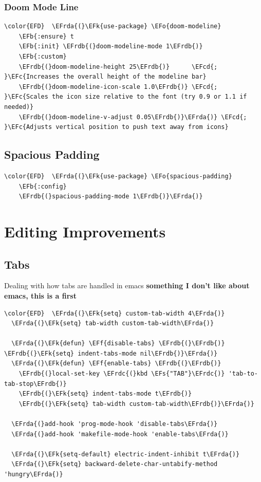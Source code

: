 \documentclass[11pt]{article}
\newcommand{\EFc}[1]{\textcolor{EFc}{#1}} %
\newcommand{\EFcd}[1]{\textcolor{EFcd}{#1}} %
\newcommand{\EFs}[1]{\textcolor{EFs}{#1}} %
\newcommand{\EFk}[1]{\textcolor{EFk}{#1}} %
\newcommand{\EFb}[1]{\textcolor{EFb}{#1}} %
\newcommand{\EFf}[1]{\textcolor{EFf}{#1}} %
\newcommand{\EFo}[1]{\textcolor{EFo}{#1}} %
\newcommand{\EFrda}[1]{\textcolor{EFrda}{#1}} %
\newcommand{\EFrdb}[1]{\textcolor{EFrdb}{#1}} %
\newcommand{\EFrdc}[1]{\textcolor{EFrdc}{#1}} %
\begin{document}
\subsubsection{Doom Mode Line}
\label{sec:orgdf8e8bd}
\begin{Code}
\begin{Verbatim}
\color{EFD}  \EFrda{(}\EFk{use-package} \EFo{doom-modeline}   
    \EFb{:ensure} t   
    \EFb{:init} \EFrdb{(}doom-modeline-mode 1\EFrdb{)}   
    \EFb{:custom} 
    \EFrdb{(}doom-modeline-height 25\EFrdb{)}      \EFcd{; }\EFc{Increases the overall height of the modeline bar}
    \EFrdb{(}doom-modeline-icon-scale 1.0\EFrdb{)} \EFcd{; }\EFc{Scales the icon size relative to the font (try 0.9 or 1.1 if needed)}
    \EFrdb{(}doom-modeline-v-adjust 0.05\EFrdb{)}\EFrda{)} \EFcd{; }\EFc{Adjusts vertical position to push text away from icons}
\end{Verbatim}
\end{Code}

\subsection{Spacious Padding}
\label{sec:org22adedb}
\begin{Code}
\begin{Verbatim}
\color{EFD}  \EFrda{(}\EFk{use-package} \EFo{spacious-padding}
    \EFb{:config}
    \EFrdb{(}spacious-padding-mode 1\EFrdb{)}\EFrda{)}
\end{Verbatim}
\end{Code}

\section{Editing Improvements}
\label{sec:org5b7568b}
\subsection{Tabs}
\label{sec:org240ee8d}
Dealing with how tabs are handled in emacs \textbf{something I don't like about emacs, this is a first}
\begin{Code}
\begin{Verbatim}
\color{EFD}  \EFrda{(}\EFk{setq} custom-tab-width 4\EFrda{)}
  \EFrda{(}\EFk{setq} tab-width custom-tab-width\EFrda{)}

  \EFrda{(}\EFk{defun} \EFf{disable-tabs} \EFrdb{(}\EFrdb{)} \EFrdb{(}\EFk{setq} indent-tabs-mode nil\EFrdb{)}\EFrda{)}
  \EFrda{(}\EFk{defun} \EFf{enable-tabs} \EFrdb{(}\EFrdb{)}
    \EFrdb{(}local-set-key \EFrdc{(}kbd \EFs{"TAB"}\EFrdc{)} 'tab-to-tab-stop\EFrdb{)}
    \EFrdb{(}\EFk{setq} indent-tabs-mode t\EFrdb{)}
    \EFrdb{(}\EFk{setq} tab-width custom-tab-width\EFrdb{)}\EFrda{)}

  \EFrda{(}add-hook 'prog-mode-hook 'disable-tabs\EFrda{)}
  \EFrda{(}add-hook 'makefile-mode-hook 'enable-tabs\EFrda{)}

  \EFrda{(}\EFk{setq-default} electric-indent-inhibit t\EFrda{)}
  \EFrda{(}\EFk{setq} backward-delete-char-untabify-method 'hungry\EFrda{)}
\end{Verbatim}
\end{Code}
\end{document}
